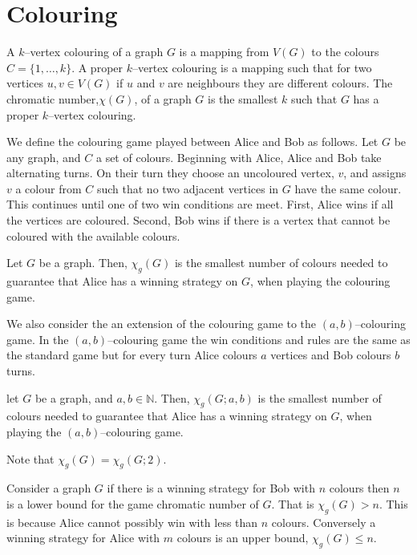 \chapter{Colouring}

A $k$--vertex colouring of a graph $G$ is a mapping from $V(G)$ to the colours $C=\{1,\dots,k\}$. A proper $k$--vertex colouring is a mapping such that for two vertices $u,v\in V(G)$ if $u$ and $v$ are neighbours they are different colours. The chromatic number,$\chi(G)$, of a graph $G$ is the smallest $k$ such that $G$ has a proper  $k$--vertex colouring.

We define the colouring game played between Alice and Bob as follows. Let $G$ be any graph, and $C$ a set of colours. Beginning with Alice, Alice and Bob take alternating turns. On their turn they choose an uncoloured vertex, $v$, and assigns $v$ a colour from $C$ such that no two adjacent vertices in $G$ have the same colour. This continues until one of two win conditions are meet. First, Alice wins if all the vertices are coloured. Second, Bob wins if there is a vertex that cannot be coloured with the available colours.


\begin{definition}
    Let $G$ be a graph. Then, $\chi_g(G)$ is the smallest number of colours needed to guarantee that Alice has a winning strategy on $G$, when playing the colouring game.     
\end{definition}

We also consider the an extension of the colouring game to the $(a,b)$--colouring game. In the $(a,b)$--colouring game the win conditions and rules are the same as the standard game but for every turn Alice colours $a$ vertices and Bob colours $b$ turns.
\begin{definition}
    let $G$ be a graph, and $a,b\in\mathbb{N}$. 
     Then, $\chi_g(G;a,b)$ is the smallest number of colours needed to guarantee that Alice has a winning strategy on $G$, when playing the $(a,b)$--colouring game. 
\end{definition}
Note that $\chi_g(G) = \chi_g(G;2)$.

Consider a graph $G$ if there is a winning strategy for Bob with $n$ colours then $n$ is a lower bound for the game chromatic number of $G$. That is $\chi_g(G)>n$. This is because Alice cannot possibly win with less than $n$ colours. Conversely a winning strategy for Alice with $m$ colours is an upper bound,  $\chi_g(G)\leq n$.

